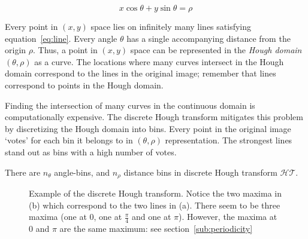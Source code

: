 \begin{equation}
\label{eq:line}
x\cos \theta + y\sin \theta = \rho
\end{equation}

Every point in $(x,y)$ space lies on infinitely many lines satisfying equation~\ref{eq:line}. Every angle $\theta$ has a single accompanying distance from the origin $\rho$. Thus, a point in $(x,y)$ space can be represented in the \emph{Hough domain} $(\theta, \rho)$ as a curve. The locations where many curves intersect in the Hough domain correspond to the lines in the original image; remember that lines correspond to points in the Hough domain. 

Finding the intersection of many curves in the continuous domain is computationally expensive. The discrete Hough transform mitigates this problem by discretizing the Hough domain into bins. Every point in the original image `votes' for each bin it belongs to in $(\theta, \rho)$ representation. The strongest lines stand out as bins with a high number of votes.

There are $n_\theta$ angle-bins, and $n_\rho$ distance bins in discrete Hough transform $\mathcal{HT}$. 

\begin{figure}[ht]
\centering
{}
\caption{Example of the discrete Hough transform. Notice the two maxima in (b) which correspond to the two lines in (a). There seem to be three maxima (one at $0$, one at $\frac{\pi}{4}$ and one at $\pi$). However, the maxima at $0$ and $\pi$ are the same maximum: see section~\ref{sub:periodicity}}
\label{fig:lines}
\end{figure}


